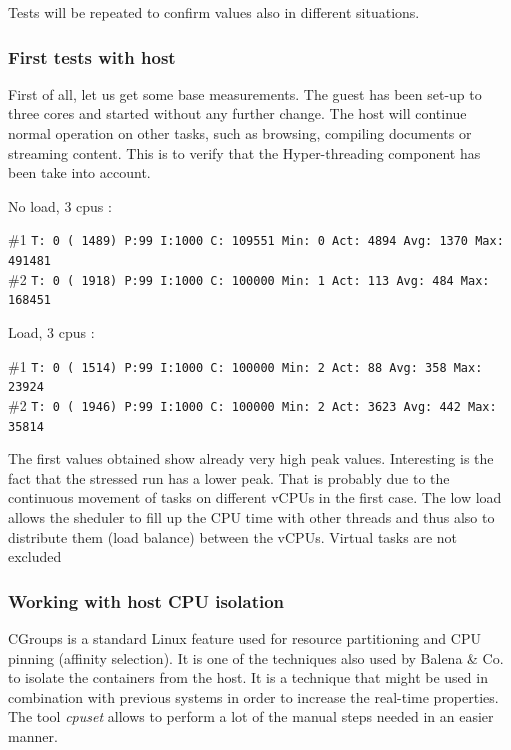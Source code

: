 \documentclass[]{scrartcl}
\begin{document}
Tests will be repeated to confirm values also in different situations.

\subsubsection{First tests with host}

First of all, let us get some base measurements. The guest has been set-up to three cores
and started without any further change. The host will continue normal operation on other tasks, such as browsing, compiling documents or streaming content. This is to verify that the Hyper-threading component has been take into account.
\bigskip

\noindent No load, 3 cpus :

\noindent \small \#1 \texttt{T: 0 ( 1489) P:99 I:1000 C: 109551 Min: 0 Act: 4894 Avg: 1370 Max:  491481}\\
\noindent \small \#2 \texttt{T: 0 ( 1918) P:99 I:1000 C: 100000 Min: 1 Act:  113 Avg:  484 Max:  168451}

\noindent Load, 3 cpus :

\noindent \small \#1 \texttt{T: 0 ( 1514) P:99 I:1000 C: 100000 Min: 2 Act:   88 Avg:  358 Max:   23924}\\
\noindent \small \#2 \texttt{T: 0 ( 1946) P:99 I:1000 C: 100000 Min: 2 Act: 3623 Avg:  442 Max:   35814}
\bigskip

The first values obtained show already very high peak values. Interesting is the fact that the stressed run has a lower peak. That is probably due to the continuous movement of tasks on different vCPUs in the first case. The low load allows the sheduler to fill up the CPU time with other threads and thus also to distribute them (load balance) between the vCPUs. Virtual tasks are not excluded

\subsubsection{Working with host CPU isolation}

CGroups is a standard Linux feature used for resource partitioning and CPU pinning (affinity selection). It is one of the techniques also used by Balena \& Co. to isolate the containers from the host. It is a technique that might be used in combination with previous systems in order to increase the real-time properties. The tool \textit{cpuset} allows to perform a lot of the manual steps needed in an easier manner. 
\end{document}
